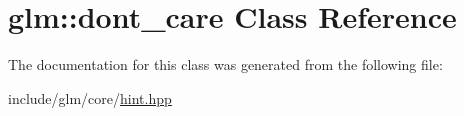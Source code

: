 \hypertarget{classglm_1_1dont__care}{\section{glm\-:\-:dont\-\_\-care \-Class \-Reference}
\label{classglm_1_1dont__care}
}


\-The documentation for this class was generated from the following file\-:\begin{DoxyCompactItemize}
\item 
include/glm/core/\hyperlink{hint_8hpp}{hint.\-hpp}\end{DoxyCompactItemize}
